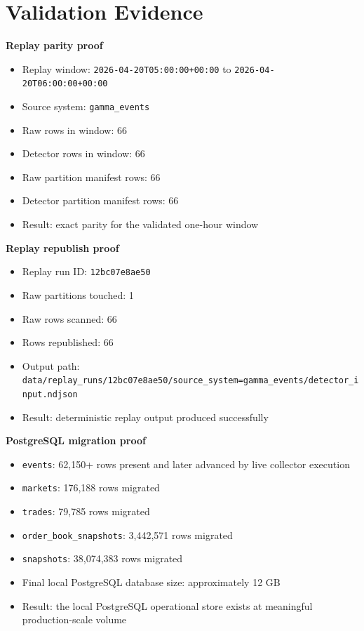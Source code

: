 \documentclass{article}
\begin{document}
\section*{Validation Evidence}

\textbf{Replay parity proof}
\begin{itemize}
\item Replay window: \texttt{2026-04-20T05:00:00+00:00} to \texttt{2026-04-20T06:00:00+00:00}
\item Source system: \texttt{gamma\_events}
\item Raw rows in window: 66
\item Detector rows in window: 66
\item Raw partition manifest rows: 66
\item Detector partition manifest rows: 66
\item Result: exact parity for the validated one-hour window
\end{itemize}

\textbf{Replay republish proof}
\begin{itemize}
\item Replay run ID: \texttt{12bc07e8ae50}
\item Raw partitions touched: 1
\item Raw rows scanned: 66
\item Rows republished: 66
\item Output path: \texttt{data/replay\_runs/12bc07e8ae50/source\_system=gamma\_events/detector\_input.ndjson}
\item Result: deterministic replay output produced successfully
\end{itemize}

\textbf{PostgreSQL migration proof}
\begin{itemize}
\item \texttt{events}: 62,150+ rows present and later advanced by live collector execution
\item \texttt{markets}: 176,188 rows migrated
\item \texttt{trades}: 79,785 rows migrated
\item \texttt{order\_book\_snapshots}: 3,442,571 rows migrated
\item \texttt{snapshots}: 38,074,383 rows migrated
\item Final local PostgreSQL database size: approximately 12 GB
\item Result: the local PostgreSQL operational store exists at meaningful production-scale volume
\end{itemize}
\end{document}
